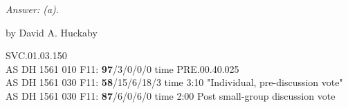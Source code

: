 	
\emph{Answer: (a).}

	by David A. Huckaby

SVC.01.03.150 \\
AS DH 1561 010 F11: {\bf 97}/3/0/0/0 time PRE.00.40.025  \\
AS DH 1561 030 F11: {\bf 58}/15/6/18/3 time 3:10 "Individual, pre-discussion vote" \\
AS DH 1561 030 F11: {\bf 87}/6/0/6/0 time 2:00 Post small-group discussion vote \\

